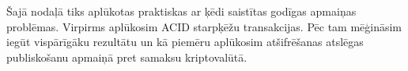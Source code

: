 Šajā nodaļā tiks aplūkotas praktiskas ar ķēdi saistītas godīgas apmaiņas problēmas.
Virpirms aplūkosim ACID starpķēžu transakcijas.
Pēc tam mēģināsim iegūt vispārīgāku rezultātu un kā piemēru aplūkosim atšifrēšanas atslēgas publiskošanu apmaiņā pret samaksu kriptovalūtā.
